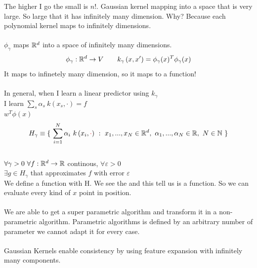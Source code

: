 \documentclass[../main.tex]{subfiles}
\begin{document}
The higher I go the small is $n!$. Gaussian kernel mapping into  a space that is very large. So large that it has infinitely many dimension. Why? Because each polynomial kernel  maps to infinitely dimensions.
\\\\
$\phi_\gamma$ maps $\mathbb{R}^d$ into a space of infinitely many dimensions.
\\
$$\phi_\gamma : \mathbb{R}^d \rightarrow V \qquad
k_\gamma \left(x, x'\right) = \phi_\gamma(x)^T \phi_\gamma(x)
$$
It maps to infinetely many dimension, so it maps to a function!
\\
\\
In general, when I learn a linear predictor using $k_\gamma$ 
\\ I learn $\sum_s \alpha_s \ k(x_s,\cdot) = f$
\\
$
w^T \phi(x)
$
$$
H_\gamma \equiv \{  \ \sum_{i = 1}^{N} \alpha_i \ k \left(x_i, \bred{$\cdot$} \right) \ : \ x_1,...,x_N \in \barra{R}^d, \ \alpha_1,..., \alpha_N \in \barra{R}, \ N \in \barra{N} \ \}
$$
\\
$ \forall \gamma > 0 \ \forall f : \mathbb{R}^d \rightarrow \mathbb{R} $ continous, $\forall \varepsilon > 0 $
\\
$
\exists g \in H_\gamma 
$ that approximates $f$ with error $\varepsilon$
\\
We define a function with H. We see the \bred{$\cdot$} and this tell us is a function. So we can evaluate every kind of $x$ point in \bred{$\cdot$} position.
\\\\
We are able to get a super parametric algorithm and transform it in a non-parametric algorithm. Parametric algorithms is defined by an arbitrary number of parameter we cannot adapt it for every case.
\\\\
Gaussian Kernels enable consistency by using feature expansion with infinitely many components.
\end{document}
